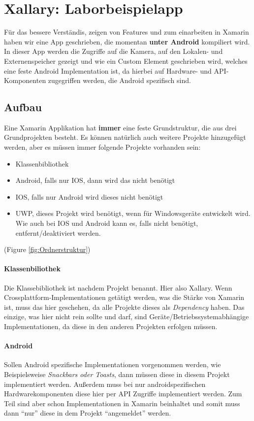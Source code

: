 \section{Xallary: Laborbeispielapp}
Für das bessere Verständis, zeigen von Features und zum einarbeiten in Xamarin haben wir eine App geschrieben, die 
momentan \textbf{unter Android} kompiliert wird.
In dieser App werden die Zugriffe auf die Kamera, auf den Lokalen- und Externenspeicher
gezeigt und wie ein Custom Element geschrieben wird, welches eine feste Android
Implementation ist, da hierbei auf Hardware- und API-Komponenten zugegriffen werden,
die Android spezifisch sind.

\subsection{Aufbau}
Eine Xamarin Applikation hat \textbf{immer} eine feste Grundstruktur, die aus drei Grundprojekten besteht.
Es können natürlich auch weitere Projekte hinzugefügt werden, aber es müssen immer folgende Projekte
vorhanden sein:
\begin{itemize}
    \item Klassenbibliothek
    \item Android, falls nur IOS, dann wird das nicht benötigt
    \item IOS, falls nur Android wird dieses nicht benötigt
    \item UWP, dieses Projekt wird benötigt, wenn für Windowsgeräte entwickelt wird. Wie auch bei IOS und Android kann es, falls nicht benötigt, entfernt/deaktiviert werden.
\end{itemize}
(Figure \ref{fig:Ordnerstruktur}) 

\paragraph{Klassenbiliothek} Die Klassebibliothek ist nachdem Projekt benannt. 
Hier also Xallary. Wenn Crossplattform-Implementationen 
getätigt werden, was die Stärke von Xamarin ist, 
muss das hier geschehen,
da alle Projekte dieses als \textit{Dependency} haben. 
Das einzige, was hier nicht rein sollte und darf, sind Geräte/Betriebssystemabhängige Implementationen, da diese in den anderen Projekten erfolgen müssen.

\paragraph{Android} Sollen Android spezifische Implementationen vorgenommen werden, wie Beispielsweise \textit{Snackbars oder Toasts}, dann 
müssen diese in diesem Projekt implementiert werden. Außerdem muss bei nur androidspezifischen Hardwarekomponenten
diese hier per API Zugriffe implementiert werden. Zum Teil sind aber schon Implementationen in Xamarin beinhaltet und somit muss dann "`nur"' diese in dem Projekt "`angemeldet"' werden.

